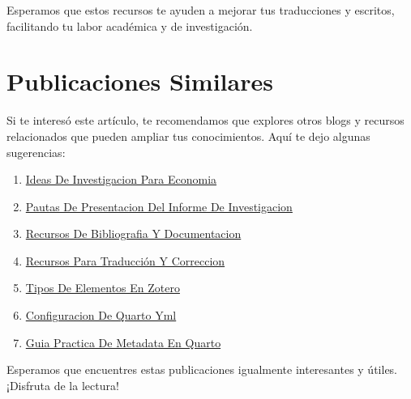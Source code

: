 \documentclass[
  jou,
  floatsintext,
  longtable,
  a4paper,
  nolmodern,
  notxfonts,
  notimes,
  12pt,
  colorlinks=true,linkcolor=blue,citecolor=blue,urlcolor=blue]{apa7}
\providecommand{\tightlist}{%
  \setlength{\itemsep}{0pt}\setlength{\parskip}{0pt}}
\begin{document}
Esperamos que estos recursos te ayuden a mejorar tus traducciones y
escritos, facilitando tu labor académica y de investigación.

\section{Publicaciones Similares}\label{publicaciones-similares}

Si te interesó este artículo, te recomendamos que explores otros blogs y
recursos relacionados que pueden ampliar tus conocimientos. Aquí te dejo
algunas sugerencias:

\begin{enumerate}
\def\labelenumi{\arabic{enumi}.}
\tightlist
\item
  \href{https://methodica.netlify.app/posts/2023-06-03-ideas-de-investigacion-para-economia/index.pdf}{}
  \href{https://methodica.netlify.app/posts/2023-06-03-ideas-de-investigacion-para-economia}{Ideas
  De Investigacion Para Economia}
\item
  \href{https://methodica.netlify.app/posts/2023-06-03-pautas-de-presentacion-del-informe-de-investigacion/index.pdf}{}
  \href{https://methodica.netlify.app/posts/2023-06-03-pautas-de-presentacion-del-informe-de-investigacion}{Pautas
  De Presentacion Del Informe De Investigacion}
\item
  \href{https://methodica.netlify.app/posts/2025-01-12-recursos-de-bibliografia-y-documentacion/index.pdf}{}
  \href{https://methodica.netlify.app/posts/2025-01-12-recursos-de-bibliografia-y-documentacion}{Recursos
  De Bibliografia Y Documentacion}
\item
  \href{https://methodica.netlify.app/posts/2025-02-09-recursos-para-traducción-y-correccion/index.pdf}{}
  \href{https://methodica.netlify.app/posts/2025-02-09-recursos-para-traducción-y-correccion}{Recursos
  Para Traducción Y Correccion}
\item
  \href{https://methodica.netlify.app/posts/2025-04-23-tipos-de-elementos-en-zotero/index.pdf}{}
  \href{https://methodica.netlify.app/posts/2025-04-23-tipos-de-elementos-en-zotero}{Tipos
  De Elementos En Zotero}
\item
  \href{https://methodica.netlify.app/posts/2026-01-02-configuracion-de-quarto-yml/index.pdf}{}
  \href{https://methodica.netlify.app/posts/2026-01-02-configuracion-de-quarto-yml}{Configuracion
  De Quarto Yml}
\item
  \href{https://methodica.netlify.app/posts/2026-01-02-guia-practica-de-metadata-en-quarto/index.pdf}{}
  \href{https://methodica.netlify.app/posts/2026-01-02-guia-practica-de-metadata-en-quarto}{Guia
  Practica De Metadata En Quarto}
\end{enumerate}

Esperamos que encuentres estas publicaciones igualmente interesantes y
útiles. ¡Disfruta de la lectura!
\end{document}
